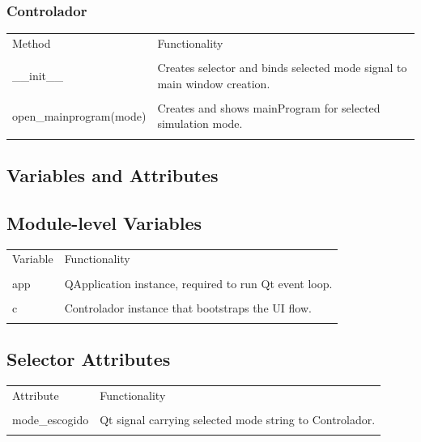 ﻿\documentclass[11pt,a4paper]{article}
\begin{document}
\subsubsection*{Controlador}

\begin{longtable}{|p{}|p{}|}
\hline
Method & Functionality \\\\
\hline
\_\_init\_\_ & Creates selector and binds selected mode signal to main window creation. \\\\
\hline
open\_mainprogram(mode) & Creates and shows mainProgram for selected simulation mode. \\\\
\hline
\end{longtable}


\subsection*{Variables and Attributes}

\subsection*{Module-level Variables}

\begin{longtable}{|p{}|p{}|}
\hline
Variable & Functionality \\\\
\hline
app & QApplication instance, required to run Qt event loop. \\\\
\hline
c & Controlador instance that bootstraps the UI flow. \\\\
\hline
\end{longtable}


\subsection*{Selector Attributes}

\begin{longtable}{|p{}|p{}|}
\hline
Attribute & Functionality \\\\
\hline
mode\_escogido & Qt signal carrying selected mode string to Controlador. \\\\
\hline
\end{longtable}
\end{document}
